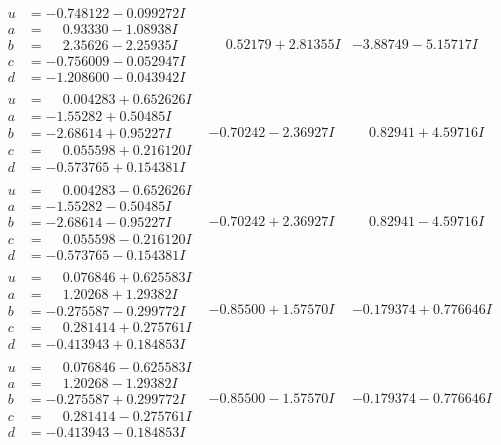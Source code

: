 \documentclass[1p]{elsarticle_modified}
\theoremstyle{definition}
\begin{document}
$$\begin{array}{c|c|c}
\begin{aligned}
u &= -0.748122 - 0.099272 I \\
a &= \phantom{-}0.93330 - 1.08938 I \\
b &= \phantom{-}2.35626 - 2.25935 I \\
c &= -0.756009 - 0.052947 I \\
d &= -1.208600 - 0.043942 I\end{aligned}
 & \phantom{-}0.52179 + 2.81355 I & -3.88749 - 5.15717 I \\ \hline\begin{aligned}
u &= \phantom{-}0.004283 + 0.652626 I \\
a &= -1.55282 + 0.50485 I \\
b &= -2.68614 + 0.95227 I \\
c &= \phantom{-}0.055598 + 0.216120 I \\
d &= -0.573765 + 0.154381 I\end{aligned}
 & -0.70242 - 2.36927 I & \phantom{-}0.82941 + 4.59716 I \\ \hline\begin{aligned}
u &= \phantom{-}0.004283 - 0.652626 I \\
a &= -1.55282 - 0.50485 I \\
b &= -2.68614 - 0.95227 I \\
c &= \phantom{-}0.055598 - 0.216120 I \\
d &= -0.573765 - 0.154381 I\end{aligned}
 & -0.70242 + 2.36927 I & \phantom{-}0.82941 - 4.59716 I \\ \hline\begin{aligned}
u &= \phantom{-}0.076846 + 0.625583 I \\
a &= \phantom{-}1.20268 + 1.29382 I \\
b &= -0.275587 - 0.299772 I \\
c &= \phantom{-}0.281414 + 0.275761 I \\
d &= -0.413943 + 0.184853 I\end{aligned}
 & -0.85500 + 1.57570 I & -0.179374 + 0.776646 I \\ \hline\begin{aligned}
u &= \phantom{-}0.076846 - 0.625583 I \\
a &= \phantom{-}1.20268 - 1.29382 I \\
b &= -0.275587 + 0.299772 I \\
c &= \phantom{-}0.281414 - 0.275761 I \\
d &= -0.413943 - 0.184853 I\end{aligned}
 & -0.85500 - 1.57570 I & -0.179374 - 0.776646 I\\

\end{array}$$
\end{document}
